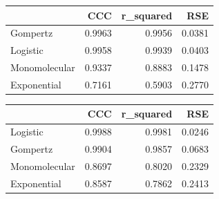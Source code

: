 \documentclass[
  letterpaper,
]{book}
\newenvironment{Shaded}{\begin{snugshade}}{\end{snugshade}}
\newcommand{\AttributeTok}[1]{\textcolor[rgb]{0.40,0.45,0.13}{#1}}
\newcommand{\FunctionTok}[1]{\textcolor[rgb]{0.28,0.35,0.67}{#1}}
\newcommand{\NormalTok}[1]{\textcolor[rgb]{0.00,0.23,0.31}{#1}}
\newcommand{\OtherTok}[1]{\textcolor[rgb]{0.00,0.23,0.31}{#1}}
\newcommand{\SpecialCharTok}[1]{\textcolor[rgb]{0.37,0.37,0.37}{#1}}
\newcommand{\StringTok}[1]{\textcolor[rgb]{0.13,0.47,0.30}{#1}}
\begin{document}
\begin{longtable}[]{@{}lrrr@{}}
\toprule\noalign{}
& CCC & r\_squared & RSE \\
\midrule\noalign{}
\endhead
\bottomrule\noalign{}
\endlastfoot
Gompertz & 0.9963 & 0.9956 & 0.0381 \\
Logistic & 0.9958 & 0.9939 & 0.0403 \\
Monomolecular & 0.9337 & 0.8883 & 0.1478 \\
Exponential & 0.7161 & 0.5903 & 0.2770 \\
\end{longtable}

\begin{Shaded}
\end{Shaded}

\begin{longtable}[]{@{}lrrr@{}}
\toprule\noalign{}
& CCC & r\_squared & RSE \\
\midrule\noalign{}
\endhead
\bottomrule\noalign{}
\endlastfoot
Logistic & 0.9988 & 0.9981 & 0.0246 \\
Gompertz & 0.9904 & 0.9857 & 0.0683 \\
Monomolecular & 0.8697 & 0.8020 & 0.2329 \\
Exponential & 0.8587 & 0.7862 & 0.2413 \\
\end{longtable}

\begin{Shaded}
\end{Shaded}
\end{document}

